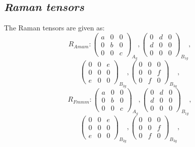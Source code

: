 \documentclass[prx,aps,twocolumn,preprintnumbers,amsmath,amssymb,superscriptaddress,showpacs]{revtex4-2}
\begin{document}
\begingroup
\renewcommand{\centering}{\raggedright}
{\subsection{\textbf{\textit{Raman tensors}} }}
\endgroup

The Raman tensors are given as\cite{Bilbao}:
\begin{equation}
\nonumber
R_{Amam}: 
\begin{pmatrix}
a & 0 & 0 \\
0 & b & 0 \\
0 & 0 & c
\end{pmatrix}_{A_g},
\begin{pmatrix}
0 & d & 0 \\
d & 0 & 0 \\
0 & 0 & 0
\end{pmatrix}_{B_{1g}},
\end{equation}
\begin{equation}
\nonumber
\begin{pmatrix}
0 & 0 & e \\
0 & 0 & 0 \\
e & 0 & 0
\end{pmatrix}_{B_{2g}},
\begin{pmatrix}
0 & 0 & 0 \\
0 & 0 & f \\
0 & f & 0
\end{pmatrix}_{B_{3g}},
\end{equation}
\begin{equation}
\nonumber
R_{Fmmm}:
\begin{pmatrix}
a & 0 & 0 \\
0 & b & 0 \\
0 & 0 & c
\end{pmatrix}_{A_g},
\begin{pmatrix}
0 & d & 0 \\
d & 0 & 0 \\
0 & 0 & 0
\end{pmatrix}_{B_{1g}},
\end{equation}
\begin{equation}
\nonumber
\begin{pmatrix}
0 & 0 & e \\
0 & 0 & 0 \\
e & 0 & 0
\end{pmatrix}_{B_{2g}},
\begin{pmatrix}
0 & 0 & 0 \\
0 & 0 & f \\
0 & f & 0
\end{pmatrix}_{B_{3g}},
\end{equation}
\end{document}
